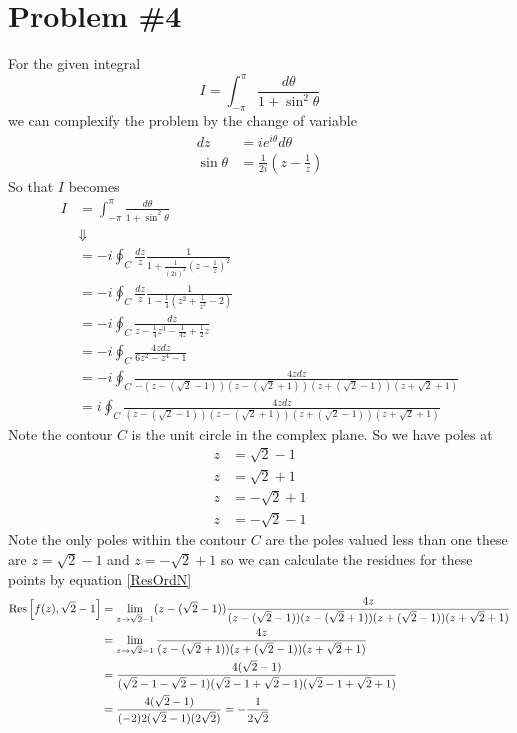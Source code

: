 \documentclass[11pt]{article}
\numberwithin{equation}{section}
\begin{document}
\pagebreak

\section{Problem \#4}
For the given integral 
$$I = \int_{-\pi}^{\pi}\frac{d\theta}{1+\sin^2\theta}$$
we can complexify the problem by the change of variable
\begin{align*}
dz &= ie^{i\theta}d\theta\\
\sin{\theta} &= \frac{1}{2i}\left(z-\frac{1}{z}\right)
\end{align*}
So that $I$ becomes
\begin{align*}
I &= \int_{-\pi}^{\pi}\frac{d\theta}{1+\sin^2\theta}\\
&\Downarrow\\
&= -i\oint_{C}\frac{dz}{z}\frac{1}{1+\frac{1}{(2i)^2}\left(z-\frac{1}{z}\right)^2}\\
&= -i\oint_{C}\frac{dz}{z}\frac{1}{1-\frac{1}{4}\left(z^2+\frac{1}{z^2}-2\right)}\\
&= -i\oint_{C}\frac{dz}{z-\frac{1}{4}z^3-\frac{1}{4z}+\frac{1}{2}z}\\
&= -i\oint_{C}\frac{4zdz}{6z^2-z^4-1}\\
&= -i\oint_{C}\frac{4zdz}{-(z-(\sqrt{2}-1))(z-(\sqrt{2}+1))(z+(\sqrt{2}-1))(z+\sqrt{2}+1)}\\
&= i\oint_{C}\frac{4zdz}{(z-(\sqrt{2}-1))(z-(\sqrt{2}+1))(z+(\sqrt{2}-1))(z+\sqrt{2}+1)}
\end{align*}
Note the contour $C$ is the unit circle in the complex plane. So we have poles at
\begin{align*}
z &= \sqrt{2}-1\\
z &= \sqrt{2}+1\\
z &= -\sqrt{2}+1\\
z &= -\sqrt{2}-1
\end{align*}
Note the only poles within the contour $C$ are the poles valued less than one these are
$z = \sqrt{2}-1$ and $z=-\sqrt{2}+1$ so we can calculate the residues for these points by
equation \ref{ResOrdN}
\begin{align*}
\textnormal{Res}\left[{f(z)},{\sqrt{2}-1}\right] &= \lim_{z\rightarrow{\sqrt{2}-1}}(z-(\sqrt{2}-1))\frac{4z}{(z-(\sqrt{2}-1))(z-(\sqrt{2}+1))(z+(\sqrt{2}-1))(z+\sqrt{2}+1)}\\
&= \lim_{z\rightarrow{\sqrt{2}-1}}\frac{4z}{(z-(\sqrt{2}+1))(z+(\sqrt{2}-1))(z+\sqrt{2}+1)}\\
&= \frac{4(\sqrt{2}-1)}{(\sqrt{2}-1-\sqrt{2}-1)(\sqrt{2}-1+\sqrt{2}-1)(\sqrt{2}-1+\sqrt{2}+1)}\\
&= \frac{4(\sqrt{2}-1)}{(-2)2(\sqrt{2}-1)(2\sqrt{2})} = -\frac{1}{2\sqrt{2}}\\
\end{align*}
\end{document}
